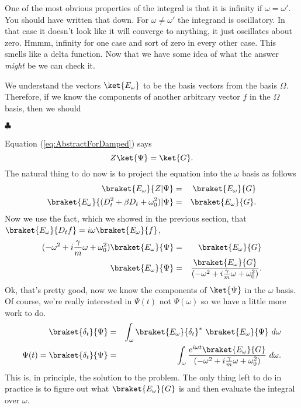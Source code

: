 One of the most obvious properties of the integral is that it is infinity if $\omega = \omega '$. You should have written that down. For $\omega \neq \omega'$ the integrand is oscillatory. In that case it doesn't look like it will converge to anything, it just oscillates about zero. Hmmm, infinity for one case and sort of zero in every other case. This smells like a delta function. Now that we have some idea of what the answer \emph{might} be we can check it. 

We understand the vectors $\ket{E_\omega}$ to be the basis vectors from the basis $\Omega$.  Therefore, if we know the components of another arbitrary vector $f$ in the $\Omega$ basis, then we should

\begin{flushleft} $\clubsuit$ \end{flushleft}
Equation (\ref{eq:AbstractForDamped}) says
\begin{displaymath} Z\ket{\Psi} = \ket{G}. \end{displaymath}
The natural thing to do now is to project the equation into the $\omega$ basis as follows
\begin{eqnarray*}
\braket{E_{\omega}}{Z|\Psi} &=& \braket{E_{\omega}}{G}\\
\braket{E_{\omega}}{(D_t^2 + \beta D_t + \omega _0^2)|\Psi} &=& \braket{E_{\omega}}{G}.
\end{eqnarray*}
Now we use the fact, which we showed in the previous section, that $\braket{E_\omega}{D_tf}=i\omega \braket{E_\omega}{f}$,
\begin{eqnarray*}
(-\omega^2 + i\frac{\gamma}{m}\omega + \omega_0^2) \braket{E_{\omega}}{\Psi}&=&\braket{E_{\omega}}{G}\\
\braket{E_{\omega}}{\Psi}&=&\frac{\braket{E_{\omega}}{G}}{(-\omega^2 + i\frac{\gamma}{m}\omega + \omega_0^2)}.
\end{eqnarray*}
Ok, that's pretty good, now we know the components of $\ket{\Psi}$ in the $\omega$ basis.  Of course, we're really interested in $\Psi(t)$ not $\Psi(\omega)$ so we have a little more work to do.
\begin{eqnarray*}
\braket{\delta_t}{\Psi} &=& \int _{\omega} \braket{E_{\omega}}{\delta_t}^*~\braket{E_{\omega}}{\Psi}~d\omega\\
\Psi(t) = \braket{\delta_t}{\Psi} &=& \int _{\omega} \frac{e^{i\omega t} \braket{E_{\omega}}{G}}{(-\omega^2 + i\frac{\gamma}{m}\omega + \omega_0^2 )}~d\omega.
\end{eqnarray*}
This is, in principle, the solution to the problem.  The only thing left to do in practice is to figure out what $\braket{E_{\omega}}{G}$ is and then evaluate the integral over $\omega$.

